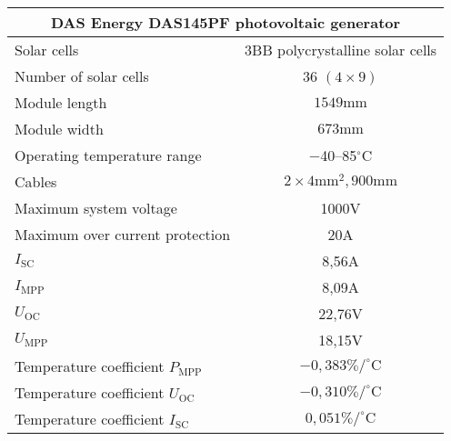 \begin{tabular}{|l|c|}
	\hline
	\multicolumn{2}{|c|}{\textbf{DAS Energy DAS145PF photovoltaic generator}} \\
	\hline
 	Solar cells & 3BB polycrystalline solar cells\\
	Number of solar cells & $36$ $(4 \times 9)$ \\
	Module length & $1549\mathrm{mm}$ \\
	Module width & $673\mathrm{mm}$\\
	Operating temperature range & \numrange{-40}{85}$^\circ \mathrm{C}$ \\
	Cables & $2 \times 4\mathrm{mm}^2, 900\mathrm{mm}$ \\
	\hline
	Maximum system voltage & 1000V \\
	Maximum over current protection & 20A \\
	$I_{\mathrm{SC}}$ & 8,56A \\
	$I_{\mathrm{MPP}}$ & 8,09A \\
	$U_{\mathrm{OC}}$ & 22,76V \\
	$U_{\mathrm{MPP}}$ & 18,15V \\
	\hline
	Temperature coefficient $P_{\mathrm{MPP}}$ & $-0,383 \mathrm{\% / ^\circ C}$ \\
	Temperature coefficient $U_{\mathrm{OC}}$ & $-0,310 \mathrm{\% / ^\circ C}$ \\
	Temperature coefficient $I_{\mathrm{SC}}$ & $0,051 \mathrm{\% / ^\circ C}$ \\
	\hline
\end{tabular}